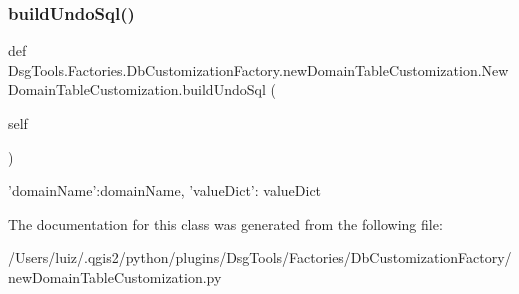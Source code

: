 \subsubsection{\texorpdfstring{build\+Undo\+Sql()}{buildUndoSql()}}
{\footnotesize\ttfamily def Dsg\+Tools.\+Factories.\+Db\+Customization\+Factory.\+new\+Domain\+Table\+Customization.\+New\+Domain\+Table\+Customization.\+build\+Undo\+Sql (\begin{DoxyParamCaption}\item[{}]{self }\end{DoxyParamCaption})}

\begin{DoxyVerb}{'domainName':domainName, 'valueDict': valueDict}
\end{DoxyVerb}
 

The documentation for this class was generated from the following file\+:\begin{DoxyCompactItemize}
\item 
/\+Users/luiz/.\+qgis2/python/plugins/\+Dsg\+Tools/\+Factories/\+Db\+Customization\+Factory/new\+Domain\+Table\+Customization.\+py\end{DoxyCompactItemize}
